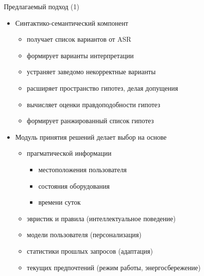 \documentclass{beamer}
\begin{document}
\begin{frame}{Предлагаемый подход (1)}
\begin{itemize}
	\item Синтактико-семантический компонент
		\begin{itemize}
			\item получает список вариантов от ASR
			\item формирует варианты интерпретации
			\item устраняет заведомо некорректные варианты
			\item расширяет пространство гипотез, делая допущения
			\item вычисляет оценки правдоподобности гипотез
			\item формирует ранжированный список гипотез
		\end{itemize}
		\bigskip
	\item Модуль принятия решений делает выбор на основе 
		\begin{itemize}
			\item прагматической информации
				\begin{itemize}
					\item местоположения пользователя
					\item состояния оборудования
					\item времени суток
				\end{itemize}
			\item эвристик и правила (интеллектуальное поведение)
			\item модели пользователя (персонализация) 
			\item статистики прошлых запросов (адаптация)
			\item текущих предпочтений (режим работы, энергосбережение)
		\end{itemize}
\end{itemize}
\end{frame}
\end{document}

